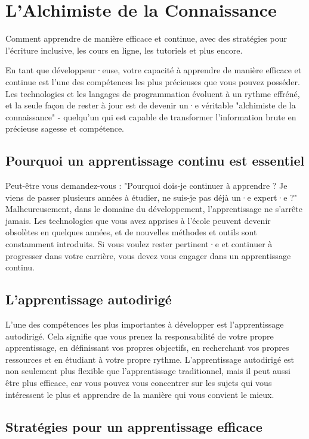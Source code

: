 \chapter{L'Alchimiste de la Connaissance}

Comment apprendre de manière efficace et continue, avec des stratégies pour l'écriture inclusive, les cours en ligne, les tutoriels et plus encore.

En tant que développeur·euse, votre capacité à apprendre de manière efficace et continue est l'une des compétences les plus précieuses que vous pouvez posséder. Les technologies et les langages de programmation évoluent à un rythme effréné, et la seule façon de rester à jour est de devenir un·e véritable "alchimiste de la connaissance" - quelqu'un qui est capable de transformer l'information brute en précieuse sagesse et compétence.

\section{Pourquoi un apprentissage continu est essentiel}

Peut-être vous demandez-vous : "Pourquoi dois-je continuer à apprendre ? Je viens de passer plusieurs années à étudier, ne suis-je pas déjà un·e expert·e ?" Malheureusement, dans le domaine du développement, l'apprentissage ne s'arrête jamais. Les technologies que vous avez apprises à l'école peuvent devenir obsolètes en quelques années, et de nouvelles méthodes et outils sont constamment introduits. Si vous voulez rester pertinent·e et continuer à progresser dans votre carrière, vous devez vous engager dans un apprentissage continu.

\section{L'apprentissage autodirigé}

L'une des compétences les plus importantes à développer est l'apprentissage autodirigé. Cela signifie que vous prenez la responsabilité de votre propre apprentissage, en définissant vos propres objectifs, en recherchant vos propres ressources et en étudiant à votre propre rythme. L'apprentissage autodirigé est non seulement plus flexible que l'apprentissage traditionnel, mais il peut aussi être plus efficace, car vous pouvez vous concentrer sur les sujets qui vous intéressent le plus et apprendre de la manière qui vous convient le mieux.

\section{Stratégies pour un apprentissage efficace}

